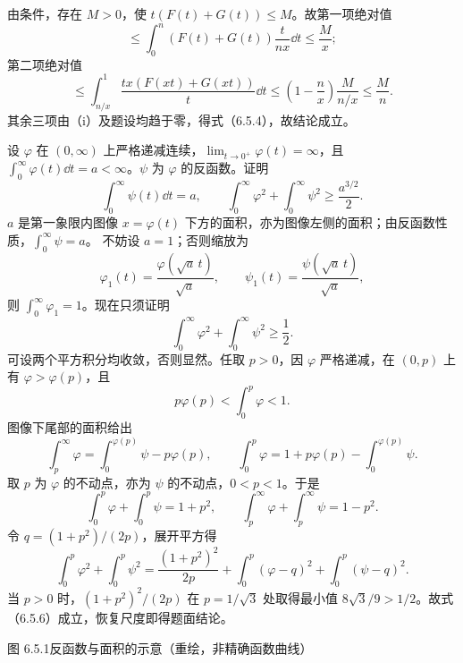 由条件，存在 $M>0$，使 $t(F(t)+G(t))\le M$。故第一项绝对值
\[
\le\int_0^n(F(t)+G(t))\frac{t}{nx}\dd t\le\frac Mx;
\]
第二项绝对值
\[
\le\int_{n/x}^1\frac{tx(F(xt)+G(xt))}{t}\dd t
\le\left(1-\frac nx\right)\frac M{n/x}\le\frac Mn.
\]
其余三项由（i）及题设均趋于零，得式（6.5.4），故结论成立。

设 $\varphi$ 在 $(0,\infty)$ 上严格递减连续，$\lim_{t\to0^+}\varphi(t)=\infty$，且 $\int_0^\infty\varphi(t)\dd t=a<\infty$。$\psi$ 为 $\varphi$ 的反函数。证明
\[
\int_0^\infty\psi(t)\dd t=a,\qquad
\int_0^\infty\varphi^2+\int_0^\infty\psi^2\ge\frac{a^{3/2}}2.
\]
\prooftext $a$ 是第一象限内图像 $x=\varphi(t)$ 下方的面积，亦为图像左侧的面积；由反函数性质，$\int_0^\infty\psi=a$。
不妨设 $a=1$；否则缩放为
\[
\varphi_1(t)=\frac{\varphi(\sqrt a\,t)}{\sqrt a},\qquad
\psi_1(t)=\frac{\psi(\sqrt a\,t)}{\sqrt a},
\]
则 $\int_0^\infty\varphi_1=1$。现在只须证明
\begin{equation}
\int_0^\infty\varphi^2+\int_0^\infty\psi^2\ge\frac12.\tag{6.5.6}
\end{equation}
可设两个平方积分均收敛，否则显然。任取 $p>0$，因 $\varphi$ 严格递减，在 $(0,p)$ 上有 $\varphi>\varphi(p)$，且
\[
p\varphi(p)<\int_0^p\varphi<1.
\]
图像下尾部的面积给出
\[
\int_p^\infty\varphi=\int_0^{\varphi(p)}\psi-p\varphi(p),\qquad
\int_0^p\varphi=1+p\varphi(p)-\int_0^{\varphi(p)}\psi.
\]
取 $p$ 为 $\varphi$ 的不动点，亦为 $\psi$ 的不动点，$0<p<1$。于是
\[
\int_0^p\varphi+\int_0^p\psi=1+p^2,\qquad
\int_p^\infty\varphi+\int_p^\infty\psi=1-p^2.
\]
令 $q=(1+p^2)/(2p)$，展开平方得
\[
\int_0^p\varphi^2+\int_0^p\psi^2
=\frac{(1+p^2)^2}{2p}+\int_0^p(\varphi-q)^2+\int_0^p(\psi-q)^2.
\]
当 $p>0$ 时，$(1+p^2)^2/(2p)$ 在 $p=1/\sqrt3$ 处取得最小值 $8\sqrt3/9>1/2$。故式（6.5.6）成立，恢复尺度即得题面结论。
\begin{center}\begin{minipage}{\linewidth}\centering
{}\par{\small 图 6.5.1\quad 反函数与面积的示意（重绘，非精确函数曲线）}
\end{minipage}\end{center}
